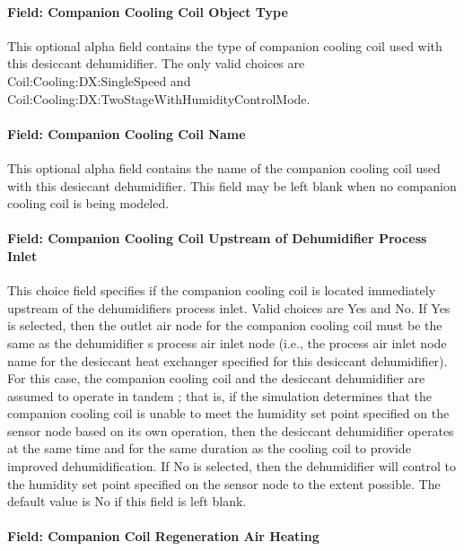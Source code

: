\paragraph{Field: Companion Cooling Coil Object Type}\label{field-companion-cooling-coil-object-type}

This optional alpha field contains the type of companion cooling coil used with this desiccant dehumidifier. The only valid choices are Coil:Cooling:DX:SingleSpeed and Coil:Cooling:DX:TwoStageWithHumidityControlMode.

\paragraph{Field: Companion Cooling Coil Name}\label{field-companion-cooling-coil-name}

This optional alpha field contains the name of the companion cooling coil used with this desiccant dehumidifier. This field may be left blank when no companion cooling coil is being modeled.

\paragraph{Field: Companion Cooling Coil Upstream of Dehumidifier Process Inlet}\label{field-companion-cooling-coil-upstream-of-dehumidifier-process-inlet}

This choice field specifies if the companion cooling coil is located immediately upstream of the dehumidifiers process inlet. Valid choices are Yes and No. If Yes is selected, then the outlet air node for the companion cooling coil must be the same as the dehumidifier s process air inlet node (i.e., the process air inlet node name for the desiccant heat exchanger specified for this desiccant dehumidifier). For this case, the companion cooling coil and the desiccant dehumidifier are assumed to operate in tandem ; that is, if the simulation determines that the companion cooling coil is unable to meet the humidity set point specified on the sensor node based on its own operation, then the desiccant dehumidifier operates at the same time and for the same duration as the cooling coil to provide improved dehumidification. If No is selected, then the dehumidifier will control to the humidity set point specified on the sensor node to the extent possible. The default value is No if this field is left blank.

\paragraph{Field: Companion Coil Regeneration Air Heating}\label{field-companion-coil-regeneration-air-heating}

